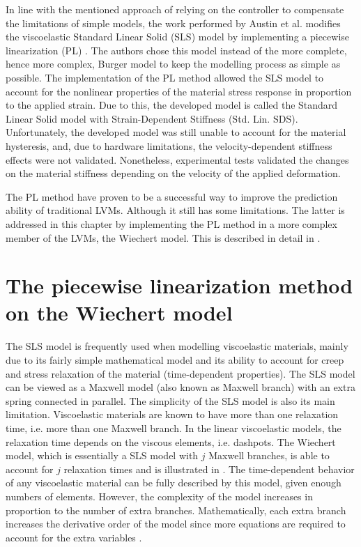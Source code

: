 In line with the mentioned approach of relying on the controller to compensate the limitations of simple models, the work performed by Austin et al. modifies the viscoelastic Standard Linear Solid (SLS) model by implementing a piecewise linearization (PL) \cite{austin2015control}. The authors chose this model instead of the more complete, hence more complex, Burger model to keep the modelling process as simple as possible. The implementation of the PL method allowed the SLS model to account for the nonlinear properties of the material stress response in proportion to the applied strain. Due to this, the developed model is called the Standard Linear Solid model with Strain-Dependent Stiffness (Std. Lin. SDS). Unfortunately, the developed model was still unable to account for the material hysteresis, and, due to hardware limitations, the velocity-dependent stiffness effects were not validated. Nonetheless, experimental tests validated the changes on the material stiffness depending on the velocity of the applied deformation.

The PL method have proven to be a successful way to improve the prediction ability of traditional LVMs. Although it still has some limitations. The latter is addressed in this chapter by implementing the PL method in a more complex member of the LVMs, the Wiechert model. This is described in detail in .

\section{The piecewise linearization method on the Wiechert model} \label{sec:wiechert}

The SLS model is frequently used when modelling viscoelastic materials, mainly due to its fairly simple mathematical model and its ability to account for creep and stress relaxation of the material (time-dependent properties). The SLS model can be viewed as a Maxwell model (also known as Maxwell branch) with an extra spring connected in parallel. The simplicity of the SLS model is also its main limitation. 
Viscoelastic materials are known to have more than one relaxation time, i.e. more than one Maxwell branch. In the linear viscoelastic models, the relaxation time depends on the viscous elements, i.e. dashpots. The Wiechert model, which is essentially a SLS model with $j$ Maxwell branches, is able to account for $j$ relaxation times and is illustrated in . The time-dependent behavior of any viscoelastic material can be fully described by this model, given enough numbers of elements. However, the complexity of the model increases in proportion to the number of extra branches. Mathematically, each extra branch increases the derivative order of the model since more equations are required to account for the extra variables \cite{tirella2014strain,roylance2001engineering}.

